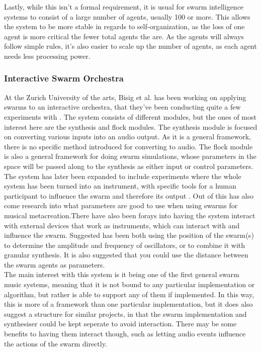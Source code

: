 \documentclass[a4paper,english]{report}
\begin{document}
	Lastly, while this isn't a formal requirement, it is usual for swarm intelligence systems to consist of a large number of agents, usually 100 or more. This allows the system to be more stable in regards to self-organization, as the loss of one agent is more critical the fewer total agents the are. As the agents will always follow simple rules, it's also easier to scale up the number of agents, as each agent needs less processing power.
	
	\subsubsection{Interactive Swarm Orchestra}
	At the Zurich University of the arts, Bisig et al. has been working on applying swarms to an interactive orchestra, that they've been conducting quite a few experiments with \cite{bisig2008interactive}. The system consists of different modules, but the ones of most interest here are the synthesis and flock modules. The synthesis module is focused on converting various inputs into an audio output. As it is a general framework, there is no specific method introduced for converting to audio. The flock module is also a general framework for doing swarm simulations, whose parameters in the space will be passed along to the synthesis as either input or control parameters.\\
	The system has later been expanded to include experiments where the whole system has been turned into an instrument, with specific tools for a human participant to influence the swarm and therefore its output \cite{bisig2012tools}. Out of this has also come research into what parameters are good to use when using swarms for musical metacreation.There have also been forays into having the system interact with external devices that work as instruments, which can interact with and influence the swarm. Suggested has been both using the position of the swarm(s) to determine the amplitude and frequency of oscillators, or to combine it with granular synthesis. It is also suggested that you could use the distance between the swarm agents as parameters.\\
	The main interest with this system is it being one of the first general swarm music systems, meaning that it is not bound to any particular implementation or algorithm, but rather is able to support any of them if implemented. In this way, this is more of a framework than one particular implementation, but it does also suggest a structure for similar projects, in that the swarm implementation and synthesiser could be kept seperate to avoid interaction. There may be some benefits to having them interact though, such as letting audio events influence the actions of the swarm directly.
	
\end{document}
